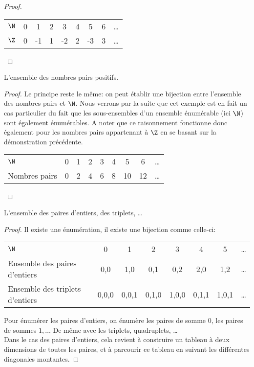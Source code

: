 \begin{myexem}
\begin{myexem}
\begin{proof}
  \begin{tabular}{ l | c c c c c c c r }
     $\N$ & 0 & 1 & 2  & 3 & 4 & 5 & 6 & \ldots \\
     $\Z$ & 0 & -1 & 1 & -2 & 2 & -3 & 3  & \ldots \\

    \end{tabular}
  \end{proof}
\end{myexem}

\begin{myexem}
 L'ensemble des nombres pairs positifs.
  \begin{proof}
  Le principe reste le même: on peut établir une bijection entre l'ensemble des nombres pairs et $\N$. Nous verrons par la suite que cet exemple est en fait un cas particulier du fait que les sous-ensembles d'un ensemble énumérable (ici $\N$) sont également énumérables. A noter que ce raisonnement fonctionne donc également pour les nombres pairs appartenant à $\Z$ en se basant sur la démonstration précédente.

   \begin{tabular}{ l c c c c c c c r }
    $\N$ & 0 & 1 & 2  & 3 & 4 & 5 & 6 & \ldots \\
      Nombres pairs & 0 & 2 & 4 & 6 & 8 & 10 & 12  & \ldots \\
    \end{tabular}
  \end{proof}
\end{myexem}

\begin{myexem}
\label{exem:paire_entiers}
  L'ensemble des paires d'entiers, des triplets, \ldots
    \begin{proof}
        Il existe une énumération, il existe une bijection comme celle-ci:

		\begin{tabular}{ l c c  c  c c c  r }
			$\N$  & 0 & 1 & 2  & 3 & 4 & 5 & \ldots  \\
			Ensemble des paires d'entiers & {0,0} & {1,0} & {0,1} & {0,2} & {2,0} & {1,2}  & \ldots \\
			Ensemble des triplets d'entiers & {0,0,0} & {0,0,1} & {0,1,0} & {1,0,0} & {0,1,1} & {1,0,1}  & \ldots \\

		\end{tabular}

	Pour énumérer les paires d'entiers, on énumère les paires de somme 0, les paires de sommes $1, \ldots$ De même avec les triplets, quadruplets, \dots \\
	Dans le cas des paires d'entiers, cela revient à construire un tableau à deux dimensions de toutes les paires, et à parcourir ce tableau en suivant les différentes diagonales montantes.
    \end{proof}
\end{myexem}


\end{myexem}
